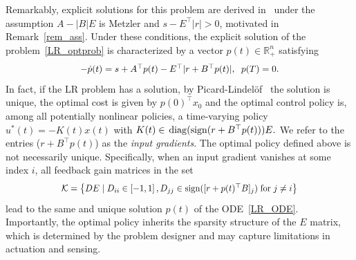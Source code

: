 \documentclass[letterpaper, 10 pt, conference]{ieeeconf}
\theoremstyle{definition}
\begin{document}
Remarkably, explicit solutions for this problem are derived in~\cite{LR_paperII} under the assumption $A-|B|E$ is Metzler and $s-E^{\top}|r|>0$, motivated in Remark~\ref{rem_ass}. Under these conditions, the explicit solution of the problem~\eqref{LR_optprob} is characterized by a vector $p(t)\in \mathbb R^n_+$ satisfying 
\begin{align}\label{LR_ODE}
        \scalebox{.95}{$-\dot p(t)= s+ A^{\top}p(t)- E^{\top} |r+B^{\top}p(t)|, \hspace{2mm} p(T)=0$}.
\end{align}
In fact, if the LR problem has a solution, by Picard-Lindelöf~\cite{kelley2010theory} the solution is unique, the optimal cost is given by  $p(0)^{\top}x_0$ and the optimal control policy is, among all potentially nonlinear policies, a time-varying policy $u^*(t)=-K(t)x(t)$ with $K(t)\in \hspace{0.5mm}\mathrm{diag}(\mathrm{sign}(r+B^{\top}p(t)))E.$ We refer to the entries ($r+B^{\top}p(t)$) as the \textit{input gradients}. The optimal policy defined above is not necessarily unique. Specifically, when an input gradient vanishes at some index $i$, all feedback gain matrices in the set 
\begin{align*}
    \scalebox{.91}{$\mathcal{K}=\left\{DE \hspace{1mm} | \hspace{1mm} D_{ii}\in \left[ -1, 1\right], D_{jj} \in \operatorname{sign}([r+p(t)^{\top}B]_j) \hspace{1mm}\mathrm{ for } \hspace{1mm} j\neq i \right\}$}
\end{align*}    
    lead to the same and unique solution $p(t)$ of the ODE~\eqref{LR_ODE}. 
Importantly,  the optimal policy inherits the sparsity structure of the $E$ matrix, which is determined by the problem designer and may capture limitations in actuation
and sensing. 
\end{document}
